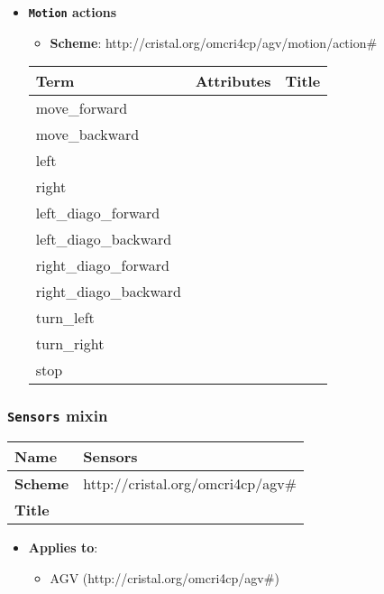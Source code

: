 \begin{itemize}
\item \textbf{\texttt{Motion} actions}

\begin{itemize}
	\item \textbf{Scheme}: http://cristal.org/omcri4cp/agv/motion/action\#
\end{itemize}

\begin{center}
\begin{tabular}{|l|l|l|}
  \hline
  \textbf{Term}  & \textbf{Attributes} & \textbf{Title} \\
  \hline  
  move\_forward & &  \\
  \hline
  move\_backward & &  \\
  \hline
  left & &  \\
  \hline
  right & &  \\
  \hline
  left\_diago_forward & &  \\
  \hline
  left\_diago_backward & &  \\
  \hline
  right\_diago_forward & &  \\
  \hline
  right\_diago_backward & &  \\
  \hline
  turn\_left & &  \\
  \hline
  turn\_right & &  \\
  \hline
  stop & &  \\
  \hline
\end{tabular}
\end{center}
\end{itemize}

 
\subsubsection{\texttt{Sensors} mixin}
\begin{center}
\begin{tabular}{|l|l|}
  \hline
  \textbf{Name} & Sensors \\
  \hline  
  \textbf{Scheme} & http://cristal.org/omcri4cp/agv\# \\
  \hline
  \textbf{Title} &  \\
  \hline
\end{tabular}
\end{center}
\begin{itemize}
\item \textbf{Applies to}:
\begin{itemize}
	\item AGV (http://cristal.org/omcri4cp/agv\#)
\end{itemize}
\end{itemize} 



